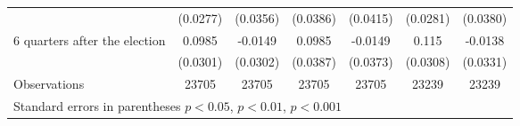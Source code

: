 \begin{table}[!ht]
\begin{tabular}{l*{6}{c}}
                    &    (0.0277)         &    (0.0356)         &    (0.0386)         &    (0.0415)         &    (0.0281)         &    (0.0380)         \\
[0,12em]
 6 quarters after the election&      0.0985\sym{**} &     -0.0149         &      0.0985\sym{*}  &     -0.0149         &       0.115\sym{***}&     -0.0138         \\
                    &    (0.0301)         &    (0.0302)         &    (0.0387)         &    (0.0373)         &    (0.0308)         &    (0.0331)         \\
\hline
Observations        &       23705         &       23705         &       23705         &       23705         &       23239         &       23239         \\
\hline\hline
\multicolumn{7}{l}{ Standard errors in parentheses \sym{*} \(p<0.05\), \sym{**} \(p<0.01\), \sym{***} \(p<0.001\)}\\\end{tabular}
\end{table}
